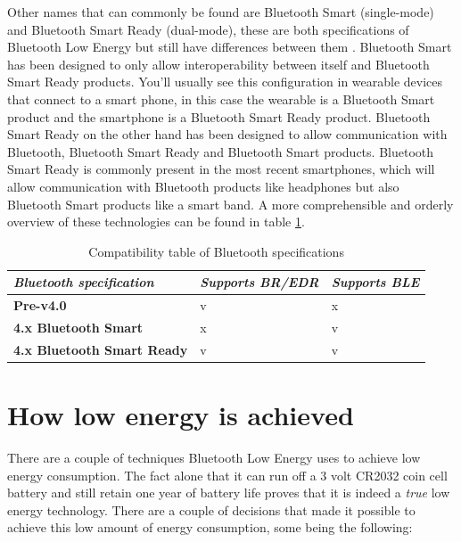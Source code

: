 \documentclass[pdftex,a4paper,12pt,twoside]{report}
\begin{document}
Other names that can commonly be found are Bluetooth Smart (single-mode) and Bluetooth Smart Ready (dual-mode), these are both specifications of Bluetooth Low Energy but still have differences between them \citep{Townsend2014}. Bluetooth Smart has been designed to only allow interoperability between itself and Bluetooth Smart Ready products. You'll usually see this configuration in wearable devices that connect to a smart phone, in this case the wearable is a Bluetooth Smart product and the smartphone is a Bluetooth Smart Ready product. Bluetooth Smart Ready on the other hand has been designed to allow communication with Bluetooth, Bluetooth Smart Ready and Bluetooth Smart products. Bluetooth Smart Ready is commonly present in the most recent smartphones, which will allow communication with Bluetooth products like headphones but also Bluetooth Smart products like a smart band. A more comprehensible and orderly overview of these technologies can be found in table \ref{table:configurations}.

\begin{table}[]
\centering
\caption{Compatibility table of Bluetooth specifications}
\label{table:configurations}
\begin{tabular}{|l|l|l|}
\hline
\textit{\textbf{Bluetooth specification}} & \textit{\textbf{Supports BR/EDR}} & \textit{\textbf{Supports BLE}} \\ \hline
\textbf{Pre-v4.0}                   & v                                 & x                              \\ \hline
\textbf{4.x Bluetooth Smart}        & x                                 & v                              \\ \hline
\textbf{4.x Bluetooth Smart Ready}  & v                                 & v                              \\ \hline
\end{tabular}
\end{table}

\section{How low energy is achieved}
\label{sec:lowenergy}
There are a couple of techniques Bluetooth Low Energy uses to achieve low energy consumption. The fact alone that it can run off a 3 volt CR2032 coin cell battery and still retain one year of battery life \citep{kamath2010measuring} proves that it is indeed a \textit{true} low energy technology. There are a couple of decisions that made it possible to achieve this low amount of energy consumption, some being the following:
\end{document}
